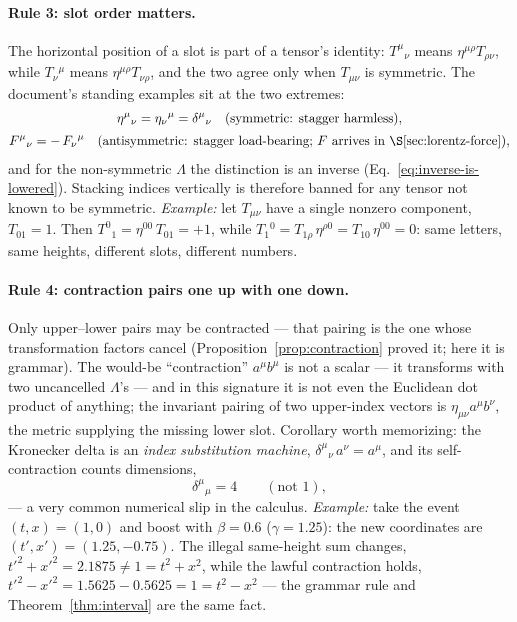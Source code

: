 \documentclass[11pt]{article}
\theoremstyle{plain}
\theoremstyle{definition}
\theoremstyle{remark}
\begin{document}
\paragraph{Rule 3: slot order matters.} The horizontal position of
a slot is part of a tensor's identity: $T^\mu{}_\nu$ means
$\eta^{\mu\rho}T_{\rho\nu}$, while $T_\nu{}^\mu$ means
$\eta^{\mu\rho}T_{\nu\rho}$, and the two agree only when
$T_{\mu\nu}$ is symmetric. The document's standing examples sit at
the two extremes:
\begin{gather}
  \eta^\mu{}_\nu = \eta_\nu{}^\mu = \delta^\mu{}_\nu
  \quad(\text{symmetric: stagger harmless}),
  \notag\\[2pt]
  F^\mu{}_\nu = -\,F_\nu{}^\mu
  \quad(\text{antisymmetric: stagger load-bearing;
  } F \text{ arrives in \S\ref{sec:lorentz-force}}),
\end{gather}
and for the non-symmetric $\Lambda$ the distinction is an inverse
(Eq.~\eqref{eq:inverse-is-lowered}). Stacking indices vertically is
therefore banned for any tensor not known to be symmetric.
\emph{Example:} let $T_{\mu\nu}$ have a single nonzero component,
$T_{01} = 1$. Then
$T^0{}_1 = \eta^{00}\,T_{01} = +1$, while
$T_1{}^0 = T_{1\rho}\,\eta^{\rho 0} = T_{10}\,\eta^{00} = 0$:
same letters, same heights, different slots, different numbers.

\paragraph{Rule 4: contraction pairs one up with one down.} Only
upper--lower pairs may be contracted --- that pairing is the one
whose transformation factors cancel
(Proposition~\ref{prop:contraction} proved it; here it is grammar). The would-be ``contraction'' $a^\mu b^\mu$ is
not a scalar --- it transforms with two uncancelled $\Lambda$'s ---
and in this signature it is not even the Euclidean dot product of
anything; the invariant pairing of two upper-index vectors is
$\eta_{\mu\nu}a^\mu b^\nu$, the metric supplying the missing lower
slot. Corollary worth memorizing: the Kronecker delta is an
\emph{index substitution machine}, $\delta^\mu{}_\nu\, a^\nu = a^\mu$,
and its self-contraction counts dimensions,
\begin{equation}
  \delta^\mu{}_\mu = 4 \qquad (\text{not } 1),
\end{equation}
--- a very common numerical slip in the calculus.
\emph{Example:} take the event $(t, x) = (1, 0)$ and boost with
$\beta = 0.6$ ($\gamma = 1.25$): the new coordinates are
$(t', x') = (1.25, -0.75)$. The illegal same-height sum changes,
$t'^2 + x'^2 = 2.1875 \ne 1 = t^2 + x^2$, while the lawful contraction
holds, $t'^2 - x'^2 = 1.5625 - 0.5625 = 1 = t^2 - x^2$ --- the
grammar rule and Theorem~\ref{thm:interval} are the same fact.
\end{document}
